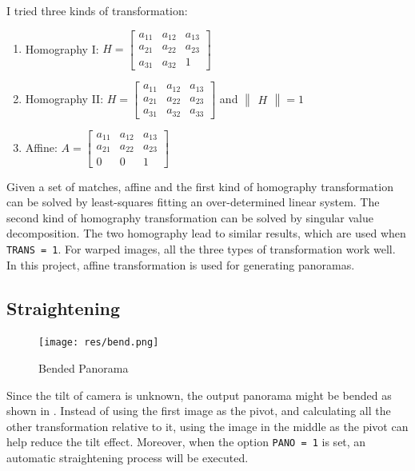 I tried three kinds of transformation:
\begin{enumerate}
  \item Homography I: $H = \begin{bmatrix} a_{11} &a_{12} & a_{13}\\ a_{21} & a_{22} & a_{23}\\ a_{31} & a_{32} & 1\end{bmatrix}$

  \item Homography II:
    $H = \begin{bmatrix} a_{11} &a_{12} & a_{13}\\ a_{21} & a_{22} & a_{23}\\ a_{31} & a_{32} & a_{33}\end{bmatrix} $
    and $\begin{Vmatrix} H \end{Vmatrix} = 1$

  \item Affine:
    $A = \begin{bmatrix} a_{11} &a_{12} & a_{13}\\ a_{21} & a_{22} & a_{23}\\ 0 & 0 & 1\end{bmatrix}$
\end{enumerate}

Given a set of matches, affine and the first kind of homography transformation can be solved
by least-squares fitting an over-determined linear system.
The second kind of homography transformation can be solved by singular value decomposition.
The two homography lead to similar results, which are used when \verb|TRANS = 1|.
For warped images, all the three types of transformation work well.
In this project, affine transformation is used for generating panoramas.

\subsection{Straightening}
\begin{figure}[H]
  \centering
  \texttt{[image: res/bend.png]}
  \caption{Bended Panorama\label{fig:bend}}
\end{figure}

Since the tilt of camera is unknown, the output panorama might be bended as shown in .
Instead of using the first image as the pivot, and calculating all the other transformation relative to it,
using the image in the middle as the pivot can help reduce the tilt effect.
Moreover, when the option \verb|PANO = 1| is set, an automatic straightening process will be executed.

